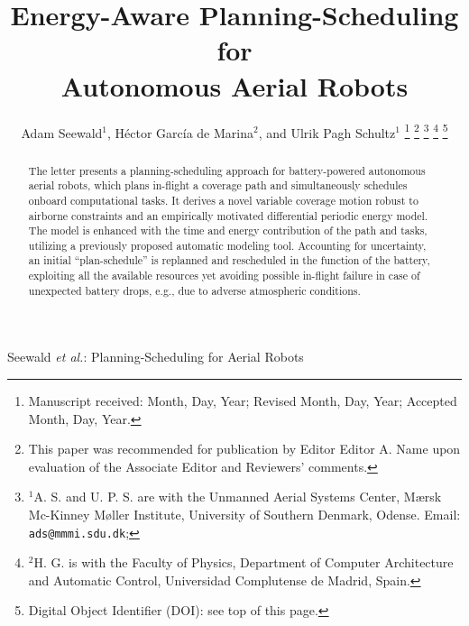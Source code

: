 \documentclass[letterpaper,10pt,journal,twoside]{IEEEtran}
\theoremstyle{definition}
\begin{document}
\title{Energy-Aware Planning-Scheduling for\\Autonomous Aerial Robots}

\author{
  Adam Seewald$^{\text{1}}$, H\'ector Garc\'ia de Marina$^{\text{2}}$, %
  and Ulrik Pagh Schultz$^{\text{1}}$
  \thanks{Manuscript received: Month, Day, Year; Revised Month, Day, Year; Accepted Month, Day, Year.}%
  \thanks{This paper was recommended for publication by Editor Editor A. Name upon evaluation of the Associate Editor and Reviewers' comments.} %
  \thanks{$^{\text{1}}$A. S. %
  and U. P. S. are with the Unmanned Aerial Systems Center, M{\ae}rsk Mc-Kinney M{\o}ller Institute, University of Southern Denmark, Odense. Email: {\tt\footnotesize ads@mmmi.sdu.dk};} 
  \thanks{$^{\text{2}}$H. G. is with the Faculty of Physics, Department of Computer Architecture and Automatic Control, Universidad Complutense de Madrid, Spain.}
  \thanks{Digital Object Identifier (DOI): see top of this page.}
}

{Seewald \MakeLowercase{\textit{et al.}}: Planning-Scheduling for Aerial Robots} 

\maketitle

\begin{abstract}
  The letter presents a planning-scheduling approach for battery-powered autonomous aerial robots, which plans in-flight a coverage path and simultaneously schedules onboard computational tasks. It derives a novel variable coverage motion robust to airborne constraints and an empirically motivated differential periodic energy model. The model is enhanced with the time and energy contribution of the path and tasks, utilizing a previously proposed automatic modeling tool. Accounting for uncertainty, an initial ``plan-schedule'' is replanned and rescheduled in the function of the battery, exploiting all the available resources yet avoiding possible in-flight failure in case of unexpected battery drops, e.g., due to adverse atmospheric conditions.
\end{abstract}
\end{document}
